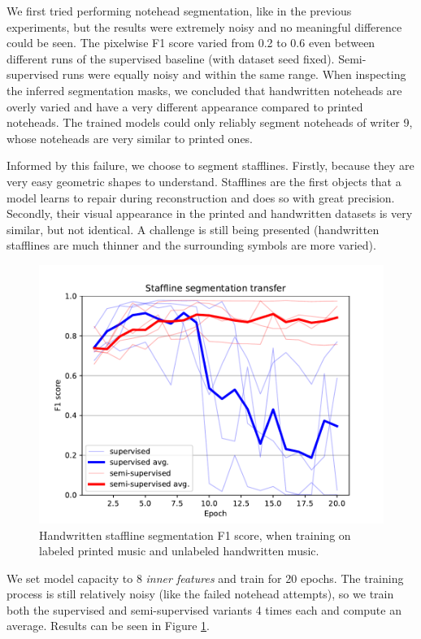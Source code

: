 We first tried performing notehead segmentation, like in the previous experiments, but the results were extremely noisy and no meaningful difference could be seen. The pixelwise F1 score varied from 0.2 to 0.6 even between different runs of the supervised baseline (with dataset seed fixed). Semi-supervised runs were equally noisy and within the same range. When inspecting the inferred segmentation masks, we concluded that handwritten noteheads are overly varied and have a very different appearance compared to printed noteheads. The trained models could only reliably segment noteheads of writer 9, whose noteheads are very similar to printed ones.

Informed by this failure, we choose to segment stafflines. Firstly, because they are very easy geometric shapes to understand. Stafflines are the first objects that a model learns to repair during reconstruction and does so with great precision. Secondly, their visual appearance in the printed and handwritten datasets is very similar, but not identical. A challenge is still being presented (handwritten stafflines are much thinner and the surrounding symbols are more varied).

\begin{figure}[ht]
    \centering
    \includegraphics[width=140mm]{../../figures/04-staffline-transfer/transfer.pdf}
    \caption{Handwritten staffline segmentation F1 score, when training on labeled printed music and unlabeled handwritten music.}
    \label{fig:StafflineTransfer}
\end{figure}

We set model capacity to 8 \emph{inner features} and train for 20 epochs. The training process is still relatively noisy (like the failed notehead attempts), so we train both the supervised and semi-supervised variants 4 times each and compute an average. Results can be seen in Figure \ref{fig:StafflineTransfer}.

